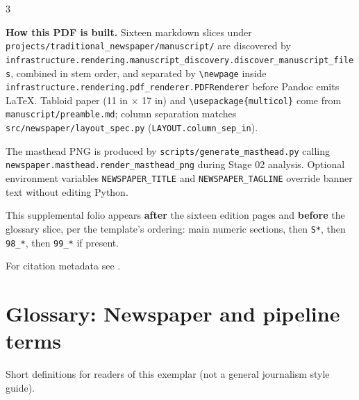 \documentclass[
]{article}
\begin{document}
\begin{multicols}{3}

\textbf{How this PDF is built.} Sixteen markdown slices under
\texttt{projects/traditional\_newspaper/manuscript/} are discovered by
\texttt{infrastructure.rendering.manuscript\_discovery.discover\_manuscript\_files},
combined in stem order, and separated by
\texttt{\textbackslash{}newpage} inside
\texttt{infrastructure.rendering.pdf\_renderer.PDFRenderer} before
Pandoc emits LaTeX. Tabloid paper (11 in × 17 in) and
\texttt{\textbackslash{}usepackage\{multicol\}} come from
\texttt{manuscript/preamble.md}; column separation matches
\texttt{src/newspaper/layout\_spec.py}
(\texttt{LAYOUT.column\_sep\_in}).

The masthead PNG is produced by \texttt{scripts/generate\_masthead.py}
calling \texttt{newspaper.masthead.render\_masthead\_png} during Stage
02 analysis. Optional environment variables \texttt{NEWSPAPER\_TITLE}
and \texttt{NEWSPAPER\_TAGLINE} override banner text without editing
Python.

This supplemental folio appears \textbf{after} the sixteen edition pages
and \textbf{before} the glossary slice, per the template's ordering:
main numeric sections, then \texttt{S*}, then \texttt{98\_*}, then
\texttt{99\_*} if present.

\noindent For citation metadata see \cite{template2026gazette}.
\par\smallskip

\end{multicols}

\newpage

\section{Glossary: Newspaper and pipeline
terms}\label{glossary-newspaper-and-pipeline-terms}

Short definitions for readers of this exemplar (not a general journalism
style guide).
\end{document}
